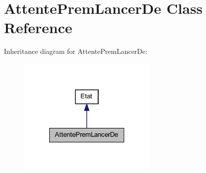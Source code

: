 \hypertarget{class_attente_prem_lancer_de}{
\section{AttentePremLancerDe Class Reference}
\label{class_attente_prem_lancer_de}
}


Inheritance diagram for AttentePremLancerDe:
\nopagebreak
\begin{figure}[H]
\begin{center}
\leavevmode
\includegraphics[width=192pt]{class_attente_prem_lancer_de__inherit__graph}
\end{center}
\end{figure}


